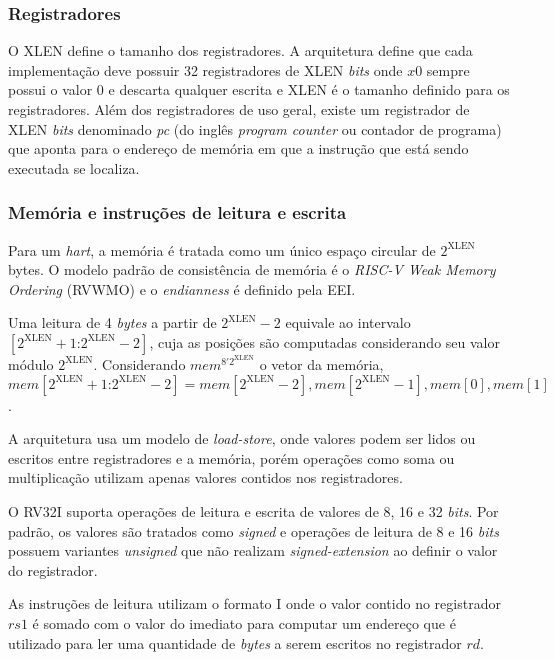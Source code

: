 \subsubsection{Registradores}
\label{ssec:reg}

    O XLEN define o tamanho dos registradores. A arquitetura define que cada implementação 
    deve possuir 32 registradores de XLEN \emph{bits} onde $x0$ sempre possui o valor 0 e descarta
    qualquer escrita e XLEN é o tamanho definido para os registradores.
    Além dos registradores de uso geral, existe um registrador de XLEN 
    \emph{bits} denominado \emph{pc} (do inglês \emph{program counter} ou contador de programa) 
    que aponta para o endereço de memória em que a instrução que está sendo executada se localiza.

\subsubsection{Memória e instruções de leitura e escrita}
\label{ssec:rw}

    Para um \emph{hart}, a memória é tratada como um único espaço circular de $2^{\text{XLEN}}$ bytes.
    O modelo padrão de consistência de memória é o \emph{RISC-V Weak Memory Ordering} (RVWMO) \citep{RVS1}
    e o \emph{endianness} é definido pela EEI.

    Uma leitura de 4 \emph{bytes} a partir de $2^{\text{XLEN}} - 2$ equivale ao intervalo 
    $[2^{\text{XLEN}}+1\text{:}2^{\text{XLEN}} - 2]$, cuja as posições são computadas considerando seu valor módulo
    $2^{\text{XLEN}}$. Considerando $mem^{8'2^{\text{XLEN}}}$ o vetor da memória, 
    $mem[{2^{\text{XLEN}}+1\text{:}2^{\text{XLEN}} - 2}] = {mem[2^{\text{XLEN}} - 2], mem[2^{\text{XLEN}} - 1], mem[0], mem[1]}$.

    A arquitetura usa um modelo de \emph{load-store}, onde valores podem ser lidos ou escritos entre 
    registradores e a memória, porém operações como soma ou multiplicação utilizam apenas valores contidos 
    nos registradores.

    O RV32I suporta operações de leitura e escrita de valores de 8, 16 e 32 \emph{bits}. Por padrão, os valores 
    são tratados como \emph{signed} e operações de leitura de 8 e 16 \emph{bits} possuem variantes \emph{unsigned}
    que não realizam \emph{signed-extension} ao definir o valor do registrador.

    As instruções de leitura utilizam o formato I onde o valor contido no registrador $rs1$ é somado com o valor
    do imediato para computar um endereço que é utilizado para ler uma quantidade de \emph{bytes} a serem escritos
    no registrador $rd$.

